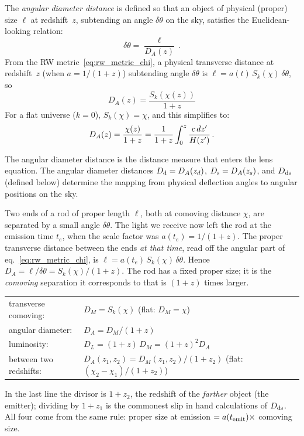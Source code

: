 The \emph{angular diameter distance} is defined so that an object of
physical (proper) size $\ell$ at redshift~$z$, subtending an angle
$\delta\theta$ on the sky, satisfies the Euclidean-looking relation:
\begin{equation}
    \delta\theta = \frac{\ell}{D_A(z)} \,.
    \label{eq:DA_def}
\end{equation}
From the RW metric~\eqref{eq:rw_metric_chi}, a physical transverse
distance at redshift~$z$ (when $a = 1/(1+z)$) subtending angle
$\delta\theta$ is $\ell = a(t)\, S_k(\chi)\, \delta\theta$, so
\begin{equation}
    \boxed{
    D_A(z) = \frac{S_k(\chi(z))}{1+z}
    }
    \label{eq:DA}
\end{equation}
For a flat universe ($k = 0$), $S_k(\chi) = \chi$, and this simplifies to:
\begin{equation}
    D_A(z) = \frac{\chi(z)}{1+z}
    = \frac{1}{1+z} \int_0^z \frac{c\, dz'}{H(z')} \,.
    \label{eq:DA_flat}
\end{equation}

The angular diameter distance is the distance measure that enters
the lens equation.  The angular diameter distances
$D_{\mathrm{d}} = D_A(z_d)$, $D_{\mathrm{s}} = D_A(z_s)$, and $D_{\mathrm{ds}}$ (defined below)
determine the mapping from physical deflection angles to angular
positions on the sky.


\begin{derivation}
Two ends of a rod of proper length $\ell$, both at comoving distance $\chi$, are
separated by a small angle $\delta\theta$.  The light we receive now left the rod
at the emission time $t_e$, when the scale factor was $a(t_e) = 1/(1+z)$.  The
proper transverse distance between the ends \emph{at that time}, read off the
angular part of eq.~\eqref{eq:rw_metric_chi}, is
$\ell = a(t_e)\,S_k(\chi)\,\delta\theta$.  Hence
$D_A = \ell/\delta\theta = S_k(\chi)/(1+z)$.  The rod has a fixed proper
size; it is the \emph{comoving} separation it corresponds to that is
$(1+z)$ times larger.
\end{derivation}

\begin{annotation}
\begin{tabular}{@{}ll@{}}
transverse comoving: & $D_M = S_k(\chi)$ (flat: $D_M = \chi$)\\
angular diameter: & $D_A = D_M/(1+z)$\\
luminosity: & $D_L = (1+z)\,D_M = (1+z)^2D_A$\\
between two redshifts: & $D_A(z_1,z_2) = D_M(z_1,z_2)/(1+z_2)$ \quad (flat: $(\chi_2-\chi_1)/(1+z_2)$)
\end{tabular}

\smallskip
In the last line the divisor is $1+z_2$, the redshift of the \emph{farther}
object (the emitter); dividing by $1+z_1$ is the commonest slip in hand
calculations of $D_{\mathrm{ds}}$.  All four come from the same rule: proper size at
emission $= a(t_{\rm emit})\times$ comoving size.
\end{annotation}

